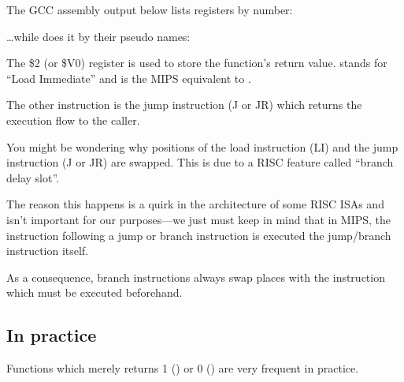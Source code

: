The GCC assembly output below lists registers by number:



\dots while \IDA does it by their pseudo names:



The \$2 (or \$V0) register is used to store the function's return value.
 stands for ``Load Immediate'' and is the MIPS equivalent to \MOV.

The other instruction is the jump instruction (J or JR) which returns the execution flow to the \gls{caller}.

You might be wondering why positions of the load instruction (LI) and the jump instruction (J or JR) are swapped. This is due to a \ac{RISC} feature called ``branch delay slot''.

The reason this happens is a quirk in the architecture of some RISC \ac{ISA}s and isn't important for our purposes---we just must keep in mind that in MIPS, the instruction following a jump or branch instruction
is executed  the jump/branch instruction itself.

As a consequence, branch instructions always swap places with the instruction which must be executed beforehand.

\subsection{In practice}

Functions which merely returns 1 () or 0 () are very frequent in practice.

